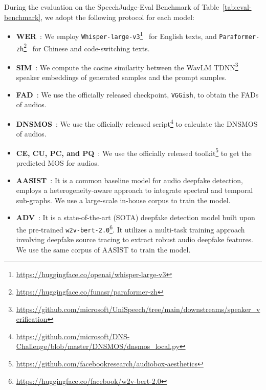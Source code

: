 \documentclass[]{bytedance_seed}
\begin{document}
During the evaluation on the SpeechJudge-Eval Benchmark of Table~\ref{tab:eval-benchmark}, we adopt the following protocol for each model:
\begin{itemize}[itemsep=1ex,leftmargin=3ex]
    \item \textbf{WER}~\citep{whisper,funasr}: We employ \texttt{Whisper-large-v3}\footnote{\href{https://huggingface.co/openai/whisper-large-v3}{https://huggingface.co/openai/whisper-large-v3}}~\citep{whisper} for English texts, and \texttt{Paraformer-zh}\footnote{\href{https://huggingface.co/funasr/paraformer-zh}{https://huggingface.co/funasr/paraformer-zh}}~\citep{paraformer, funasr} for Chinese and code-switching texts.
    \item \textbf{SIM}~\citep{wavlm}: We compute the cosine similarity between the WavLM TDNN\footnote{\href{https://github.com/microsoft/UniSpeech/tree/main/downstreams/speaker_verification}{https://github.com/microsoft/UniSpeech/tree/main/downstreams/speaker\_verification}}~\citep{wavlm} speaker embeddings of generated samples and the prompt samples.
    \item \textbf{FAD}~\citep{fad}: We use the officially released checkpoint, \texttt{VGGish}, to obtain the FADs of audios.
    \item \textbf{DNSMOS}~\citep{dnsmos}: We use the officially released script\footnote{\href{https://github.com/microsoft/DNS-Challenge/blob/master/DNSMOS/dnsmos\_local.py}{https://github.com/microsoft/DNS-Challenge/blob/master/DNSMOS/dnsmos\_local.py}} to calculate the DNSMOS of audios.
    \item \textbf{CE, CU, PC, and PQ}~\citep{meta-audiobox-aesthetics}: We use the officially released toolkit\footnote{\href{https://github.com/facebookresearch/audiobox-aesthetics}{https://github.com/facebookresearch/audiobox-aesthetics}} to get the predicted MOS for audios.
    \item \textbf{AASIST}~\citep{aasist}: It is a common baseline model for audio deepfake detection, employs a heterogeneity-aware approach to integrate spectral and temporal sub-graphs. We use a large-scale in-house corpus to train the model.
    \item \textbf{ADV}~\citep{audio-deepfake-verification}: It is a state-of-the-art (SOTA) deepfake detection model built upon the pre-trained \texttt{w2v-bert-2.0}\footnote{\href{https://huggingface.co/facebook/w2v-bert-2.0}{https://huggingface.co/facebook/w2v-bert-2.0}}. It utilizes a multi-task training approach involving deepfake source tracing to extract robust audio deepfake features. We use the same corpus of AASIST to train the model.

\end{itemize}
\end{document}
